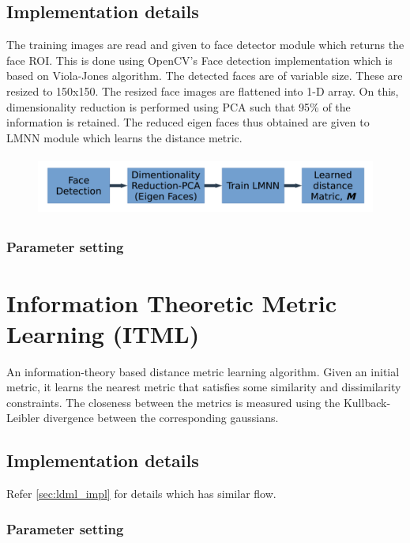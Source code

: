 \documentclass{article}
\begin{document}
\subsection{Implementation details}
The training images are read and given to face detector module which returns the face ROI. This is done using OpenCV's Face detection implementation which is based on Viola-Jones algorithm. The detected faces are of variable size. These are resized to 150x150.
The resized face images are flattened into 1-D array. On this, dimensionality reduction is performed using PCA such that 95\% of the information is retained.
The reduced eigen faces thus obtained are given to LMNN module which learns the distance metric.
\begin{figure}[H]
    \centering
    \includegraphics[height=2cm]{./lmnn_img2.png}
\end{figure}

\subsubsection{Parameter setting}

\section{Information Theoretic Metric Learning (ITML)}\label{sec:itml}
An information-theory based distance metric learning algorithm. Given an initial metric, it learns the nearest metric that satisfies some similarity and dissimilarity constraints. The closeness between the metrics is measured using the Kullback-Leibler divergence between the corresponding gaussians.

\subsection{Implementation details}
Refer \ref{sec:ldml_impl} for details which has similar flow.
\subsubsection{Parameter setting}
\end{document}

